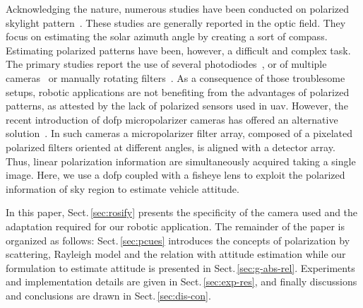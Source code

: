 Acknowledging the nature, numerous studies have been conducted on polarized
skylight pattern~\cite{lambrinos2000insectnavigation, chu2009application,
  zhao2009novel, wang2015novel,chahl2013integration, ashkanazy2015bio,
  sturzl2012fisheye, ma2015skylightpolarization,
  miyazaki09sunlightpolarization, wang2014bionic,
  lu2015angle,hamaoui2017polarized}.
These studies are generally reported in the optic field. They focus on
estimating the solar azimuth angle by creating a sort of compass.
Estimating polarized patterns
have been, however, a difficult and complex task.  The primary studies report
the use of several photodiodes~\cite{lambrinos2000insectnavigation,
  chu2009application, zhao2009novel, wang2015novel,chahl2013integration}, or of multiple cameras~\cite{ashkanazy2015bio, sturzl2012fisheye,
  wang2014bionic} or manually rotating filters~\cite{ma2015skylightpolarization,
  miyazaki09sunlightpolarization, lu2015angle, hamaoui2017polarized}.
As a consequence of those troublesome setups, robotic applications are not
benefiting from the advantages of polarized patterns, as attested  by the lack
of polarized sensors used in \gls{uav}.  However, the recent
introduction of \gls{dofp} micropolarizer cameras has offered an alternative
solution~\cite{nordin1999micropolarizer, nordin1999diffractive,
  millerd2006pixelated}.  In such cameras a micropolarizer filter array,
composed of a pixelated polarized filters oriented at different angles, is
aligned with a detector array. Thus, linear polarization information are
simultaneously acquired taking a single image. Here, we use a \gls{dofp}
coupled with a fisheye lens to exploit the polarized information of sky region
to estimate vehicle attitude.

In this paper, Sect.\,\ref{sec:rosify} presents the specificity of the camera
used and the adaptation required for our robotic application. The remainder of
the paper is organized as follows: Sect.\,\ref{sec:pcues} introduces the
concepts of polarization by scattering, Rayleigh model and the relation with
attitude estimation while our formulation to estimate attitude is presented in
Sect.\,\ref{sec:g-abs-rel}. Experiments and implementation details are given
in Sect.\,\ref{sec:exp-res}, and finally discussions and conclusions are
drawn in Sect.\,\ref{sec:dis-con}.
























